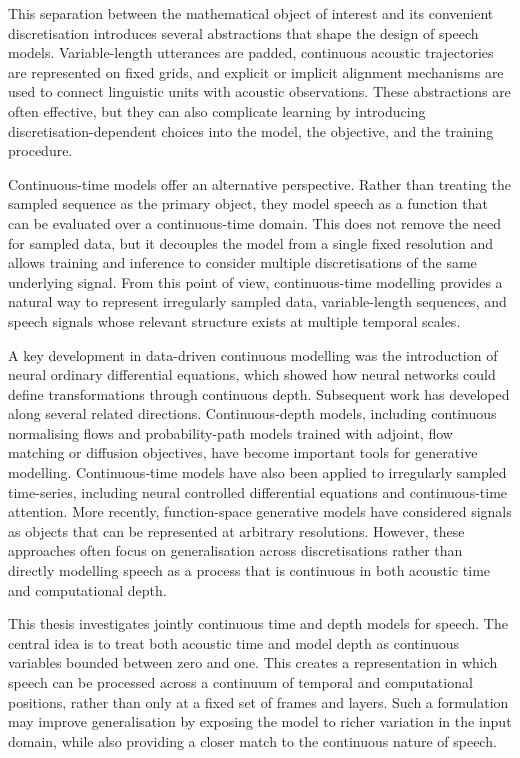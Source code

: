 
This separation between the mathematical object of interest and its convenient discretisation introduces several abstractions that shape the design of speech models. Variable-length utterances are padded, continuous acoustic trajectories are represented on fixed grids, and explicit or implicit alignment mechanisms are used to connect linguistic units with acoustic observations. These abstractions are often effective, but they can also complicate learning by introducing discretisation-dependent choices into the model, the objective, and the training procedure. %

Continuous-time models offer an alternative perspective. Rather than treating the sampled sequence as the primary object, they model speech as a function that can be evaluated over a continuous-time domain. This does not remove the need for sampled data, but it decouples the model from a single fixed resolution and allows training and inference to consider multiple discretisations of the same underlying signal. From this point of view, continuous-time modelling provides a natural way to represent irregularly sampled data, variable-length sequences, and speech signals whose relevant structure exists at multiple temporal scales. %



A key development in data-driven continuous modelling was the introduction of neural ordinary differential equations, which showed how neural networks could define transformations through continuous depth. Subsequent work has developed along several related directions. Continuous-depth models, including continuous normalising flows and probability-path models trained with adjoint, flow matching or diffusion objectives, have become important tools for generative modelling. Continuous-time models have also been applied to irregularly sampled time-series, including neural controlled differential equations and continuous-time attention. More recently, function-space generative models have considered signals as objects that can be represented at arbitrary resolutions. However, these approaches often focus on generalisation across discretisations rather than directly modelling speech as a process that is continuous in both acoustic time and computational depth.

This thesis investigates jointly continuous time and depth models for speech. The central idea is to treat both acoustic time and model depth as continuous variables bounded between zero and one. This creates a representation in which speech can be processed across a continuum of temporal and computational positions, rather than only at a fixed set of frames and layers. Such a formulation may improve generalisation by exposing the model to richer variation in the input domain, while also providing a closer match to the continuous nature of speech.

